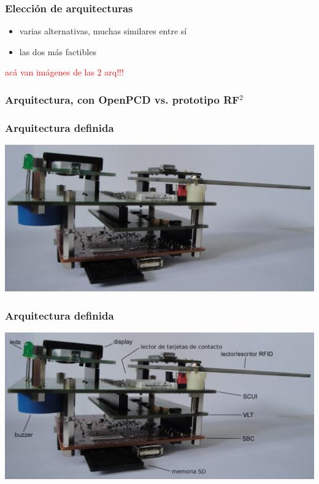 \documentclass{beamer}
\begin{document}
\begin{frame}
	\frametitle{Elección de arquitecturas}
	\begin{itemize}
		\item varias alternativas, muchas similares entre sí

		\bigskip
		\item las dos más factibles
	\end{itemize}
	\textcolor{red}{acá van imágenes de las 2 arq!!!}
	
\end{frame}

\begin{frame}
	\frametitle{Arquitectura, con OpenPCD vs. prototipo RF$^{2}$}
	\begin{center}
	\end{center}
\end{frame}

\begin{frame}
	\frametitle{Arquitectura definida}
	\begin{center}
		\includegraphics[scale=.12]{Imagenes/prototipo_s.jpg}
	\end{center}
\end{frame}


\begin{frame}
	\frametitle{Arquitectura definida}
	\begin{center}
		\includegraphics[scale=.12]{Imagenes/prototipo_s_nombres.jpg}
	\end{center}
\end{frame}
\end{document}
